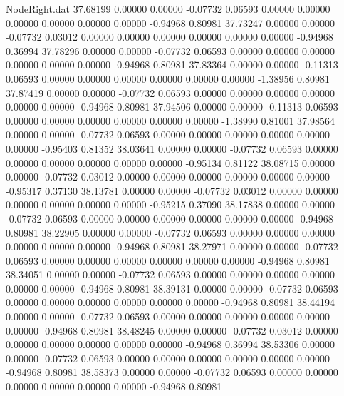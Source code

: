 \begin{filecontents}{NodeRight.dat}
  37.68199    0.00000    0.00000    -0.07732    0.06593    0.00000    0.00000    0.00000    0.00000    0.00000    0.00000   -0.94968    0.80981
  37.73247    0.00000    0.00000    -0.07732    0.03012    0.00000    0.00000    0.00000    0.00000    0.00000    0.00000   -0.94968    0.36994
  37.78296    0.00000    0.00000    -0.07732    0.06593    0.00000    0.00000    0.00000    0.00000    0.00000    0.00000   -0.94968    0.80981
  37.83364    0.00000    0.00000    -0.11313    0.06593    0.00000    0.00000    0.00000    0.00000    0.00000    0.00000   -1.38956    0.80981
  37.87419    0.00000    0.00000    -0.07732    0.06593    0.00000    0.00000    0.00000    0.00000    0.00000    0.00000   -0.94968    0.80981
  37.94506    0.00000    0.00000    -0.11313    0.06593    0.00000    0.00000    0.00000    0.00000    0.00000    0.00000   -1.38990    0.81001
  37.98564    0.00000    0.00000    -0.07732    0.06593    0.00000    0.00000    0.00000    0.00000    0.00000    0.00000   -0.95403    0.81352
  38.03641    0.00000    0.00000    -0.07732    0.06593    0.00000    0.00000    0.00000    0.00000    0.00000    0.00000   -0.95134    0.81122
  38.08715    0.00000    0.00000    -0.07732    0.03012    0.00000    0.00000    0.00000    0.00000    0.00000    0.00000   -0.95317    0.37130
  38.13781    0.00000    0.00000    -0.07732    0.03012    0.00000    0.00000    0.00000    0.00000    0.00000    0.00000   -0.95215    0.37090
  38.17838    0.00000    0.00000    -0.07732    0.06593    0.00000    0.00000    0.00000    0.00000    0.00000    0.00000   -0.94968    0.80981
  38.22905    0.00000    0.00000    -0.07732    0.06593    0.00000    0.00000    0.00000    0.00000    0.00000    0.00000   -0.94968    0.80981
  38.27971    0.00000    0.00000    -0.07732    0.06593    0.00000    0.00000    0.00000    0.00000    0.00000    0.00000   -0.94968    0.80981
  38.34051    0.00000    0.00000    -0.07732    0.06593    0.00000    0.00000    0.00000    0.00000    0.00000    0.00000   -0.94968    0.80981
  38.39131    0.00000    0.00000    -0.07732    0.06593    0.00000    0.00000    0.00000    0.00000    0.00000    0.00000   -0.94968    0.80981
  38.44194    0.00000    0.00000    -0.07732    0.06593    0.00000    0.00000    0.00000    0.00000    0.00000    0.00000   -0.94968    0.80981
  38.48245    0.00000    0.00000    -0.07732    0.03012    0.00000    0.00000    0.00000    0.00000    0.00000    0.00000   -0.94968    0.36994
  38.53306    0.00000    0.00000    -0.07732    0.06593    0.00000    0.00000    0.00000    0.00000    0.00000    0.00000   -0.94968    0.80981
  38.58373    0.00000    0.00000    -0.07732    0.06593    0.00000    0.00000    0.00000    0.00000    0.00000    0.00000   -0.94968    0.80981

\end{filecontents}
